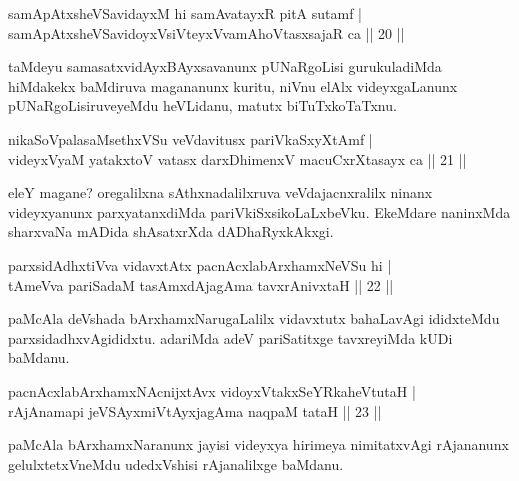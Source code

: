 \begin{shl}
samApAtxsheVSavidayxM hi samAvatayxR pitA sutamf | \\
samApAtxsheVSavidoyxV\s siVteyxVvamAhoVtasxsajaR ca \hfill|| 20 || 
\end{shl}

\begin{artha}
taMdeyu samasatxvidAyxBAyxsavanunx pUNaRgoLisi gurukuladiMda 
hiMdakekx baMdiruva magananunx kuritu, niVnu elAlx videyxgaLanunx 
pUNaRgoLisiruveyeMdu heVLidanu, matutx biTuTxkoTaTxnu. 
\end{artha}


\begin{shl}
nikaSoVpalasaMsethxVSu veVdavitusx pariVkaSxyXtAmf | \\
videyxVyaM yatakxtoV vatasx darxDhimenxV macuCxrXtasayx ca \hfill|| 21 || 
\end{shl}

\begin{artha}
eleY magane? oregalilxna sAthxnadalilxruva veVdajacnxralilx ninanx 
videyxyanunx parxyatanxdiMda pariVkiSxsikoLaLxbeVku. EkeMdare 
naninxMda sharxvaNa mADida shAsatxrXda dADhaRyxkAkxgi.
\end{artha}


\begin{shl}
parxsidAdhx\s tiVva vidavxtAtx pacnAcxlabArxhamxNeVSu hi | \\
tAmeVva pariSadaM tasAmxdAjagAma tavxrAnivxtaH \hfill|| 22 || 
\end{shl}

\begin{artha}
paMcAla deVshada bArxhamxNarugaLalilx vidavxtutx bahaLavAgi ididxteMdu 
parxsidadhx\-vAgididxtu. adariMda adeV pariSatitxge tavxreyiMda kUDi 
baMdanu.
\end{artha}


\begin{shl}
pacnAcxlabArxhamxNAcnijxtAvx vidoyxVtakxSeYRkaheVtutaH | \\
rAjAnamapi jeVSAyxmiVtAyxjagAma naqpaM tataH \hfill|| 23 || 
\end{shl}

\begin{artha}
paMcAla bArxhamxNaranunx jayisi videyxya hirimeya nimitatxvAgi 
rAjananunx gelulxtetxVneMdu udedxVshisi rAjanalilxge baMdanu.
\end{artha}

